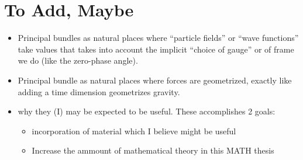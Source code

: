 \section{To Add, Maybe}
\begin{itemize}
    \item Principal bundles as natural places where ``particle fields'' or ``wave functions'' take values that takes into account the implicit ``choice of gauge'' or of frame we do (like the zero-phase angle).
    
    \item Principal bundle as natural places where forces are geometrized, exactly like adding a time dimension geometrizes gravity. 
    
    \item {} why they (I) may be expected to be useful. These accomplishes 2 goals: 
        \begin{itemize}
        \item incorporation of material which I believe might be useful
        \item Increase the ammount of mathematical theory in this MATH thesis
        \end{itemize}
\end{itemize}